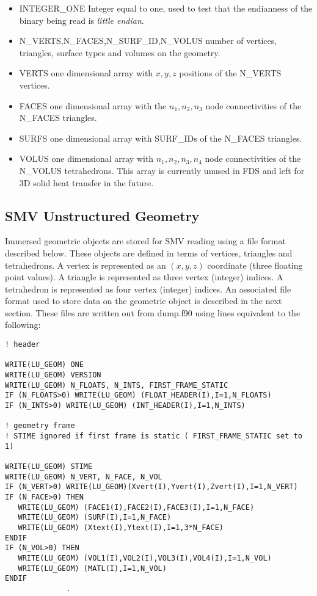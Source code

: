 \documentclass[12pt]{article}
\begin{document}
\begin{itemize}
  \item {\ct INTEGER\_ONE} Integer equal to one, used to test that the endianness of the binary being read is \textit{little endian}.
  \item {\ct N\_VERTS,N\_FACES,N\_SURF\_ID,N\_VOLUS} number of vertices, triangles, surface types and volumes on the geometry.
  \item {\ct VERTS} one dimensional array with $x,y,z$ positions of the {\ct N\_VERTS} vertices.
  \item {\ct FACES} one dimensional array with the $n_1,n_2,n_3$ node connectivities of the {\ct N\_FACES} triangles.
  \item {\ct SURFS} one dimensional array with {\ct SURF\_ID}s of the {\ct N\_FACES} triangles.
  \item {\ct VOLUS} one dimensional array with $n_1,n_2,n_3,n_4$ node connectivities of the {\ct N\_VOLUS} tetrahedrons. This array is currently unused in FDS and left for 3D solid heat transfer in the future.
\end{itemize}


\subsection{SMV Unstructured Geometry}
\label{out:GEOMETRY}

Immersed geometric objects are stored for SMV reading using a file format described below.
These objects are defined in terms of vertices, triangles and tetrahedrons.
A vertex is represented as an $(x,y,z)$ coordinate (three floating point values).
A triangle is represented as three vertex (integer) indices. A tetrahedron is represented as four vertex (integer) indices.
An associated file format used to store data  on the geometric object is described in the next section.
These files are written out from {\ct dump.f90} using lines equivalent to the following:

\begin{lstlisting}
! header

WRITE(LU_GEOM) ONE
WRITE(LU_GEOM) VERSION
WRITE(LU_GEOM) N_FLOATS, N_INTS, FIRST_FRAME_STATIC
IF (N_FLOATS>0) WRITE(LU_GEOM) (FLOAT_HEADER(I),I=1,N_FLOATS)
IF (N_INTS>0) WRITE(LU_GEOM) (INT_HEADER(I),I=1,N_INTS)

! geometry frame
! STIME ignored if first frame is static ( FIRST_FRAME_STATIC set to 1)

WRITE(LU_GEOM) STIME
WRITE(LU_GEOM) N_VERT, N_FACE, N_VOL
IF (N_VERT>0) WRITE(LU_GEOM)(Xvert(I),Yvert(I),Zvert(I),I=1,N_VERT)
IF (N_FACE>0) THEN
   WRITE(LU_GEOM) (FACE1(I),FACE2(I),FACE3(I),I=1,N_FACE)
   WRITE(LU_GEOM) (SURF(I),I=1,N_FACE)
   WRITE(LU_GEOM) (Xtext(I),Ytext(I),I=1,3*N_FACE)
ENDIF
IF (N_VOL>0) THEN
   WRITE(LU_GEOM) (VOL1(I),VOL2(I),VOL3(I),VOL4(I),I=1,N_VOL)
   WRITE(LU_GEOM) (MATL(I),I=1,N_VOL)
ENDIF
              .
\end{lstlisting}
\end{document}

